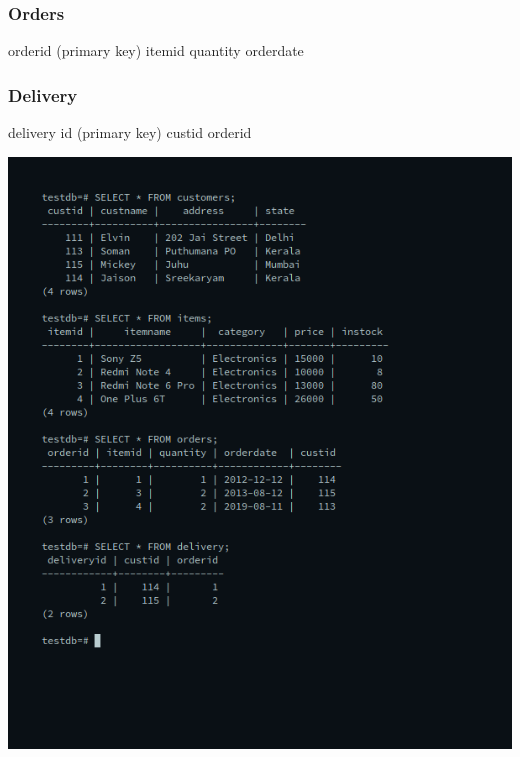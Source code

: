 \subsubsection{Orders}
orderid (primary key)\newline
itemid\newline
quantity\newline
orderdate\newline

\subsubsection{Delivery}
delivery id (primary key)\newline
custid\newline
orderid\newline

\newline
\includegraphics[width=\linewidth]{../Images/Joins/tables.png}

